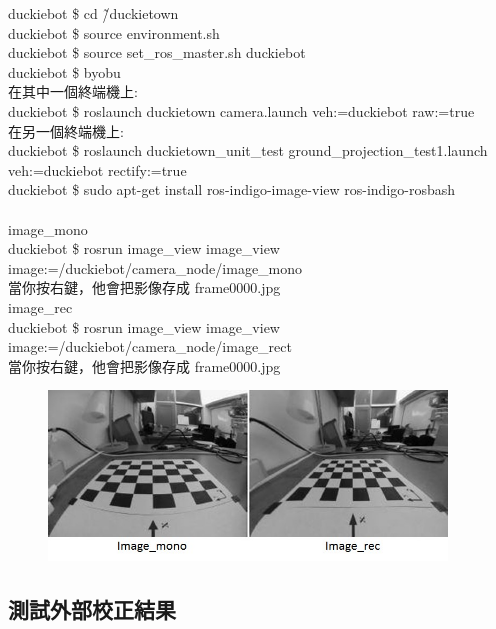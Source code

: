 \documentclass{article}
\begin{document}
duckiebot \$ cd \~/duckietown
\\duckiebot \$ source environment.sh
\\duckiebot \$ source set\_ros\_master.sh duckiebot
\\duckiebot \$ byobu
\\在其中一個終端機上:
\\duckiebot \$ roslaunch duckietown camera.launch veh:=duckiebot raw:=true
\\在另一個終端機上:
\\duckiebot \$ roslaunch duckietown\_unit\_test ground\_projection\_test1.launch veh:=duckiebot  rectify:=true
\\duckiebot \$ sudo apt-get install ros-indigo-image-view ros-indigo-rosbash
\\
\\image\_mono
\\duckiebot \$ rosrun image\_view image\_view image:=/duckiebot/camera\_node/image\_mono
\\當你按右鍵，他會把影像存成 frame0000.jpg
\\image\_rec
\\duckiebot \$ rosrun image\_view image\_view image:=/duckiebot/camera\_node/image\_rect
\\當你按右鍵，他會把影像存成 frame0000.jpg
\begin{figure}[htp]
    \begin{center}
        \includegraphics[width=300pt]{pic/圖片20.jpg}
    \end{center}
\end{figure}

\subsection{測試外部校正結果}
\end{document}
